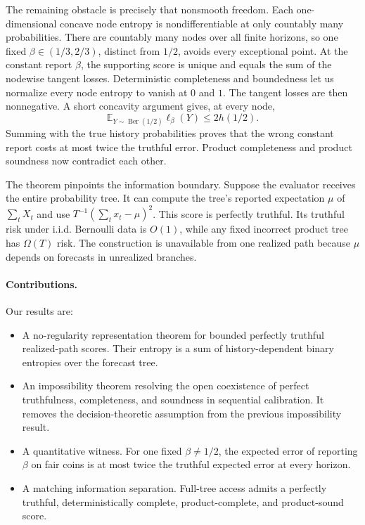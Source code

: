 \documentclass{article}
\theoremstyle{definition}
\theoremstyle{remark}
\newcommand{\Ber}{\operatorname{Ber}}
\newcommand{\E}{\mathbb E}
\newcommand{\1}{\mathbf 1}
\begin{document}
The remaining obstacle is precisely that nonsmooth freedom. Each one-dimensional concave node entropy is nondifferentiable at only countably many probabilities. There are countably many nodes over all finite horizons, so one fixed \(\beta\in(1/3,2/3)\), distinct from \(1/2\), avoids every exceptional point. At the constant report \(\beta\), the supporting score is unique and equals the sum of the nodewise tangent losses. Deterministic completeness and boundedness let us normalize every node entropy to vanish at \(0\) and \(1\). The tangent losses are then nonnegative. A short concavity argument gives, at every node, \[ \E_{Y\sim\Ber(1/2)}\ell_{\beta}(Y)\le 2h(1/2). \] Summing with the true history probabilities proves that the wrong constant report costs at most twice the truthful error. Product completeness and product soundness now contradict each other.

The theorem pinpoints the information boundary. Suppose the evaluator receives the entire probability tree. It can compute the tree's reported expectation \(\mu\) of \(\sum_tX_t\) and use \(T^{-1}(\sum_t x_t-\mu)^2\). This score is perfectly truthful. Its truthful risk under i.i.d. Bernoulli data is \(O(1)\), while any fixed incorrect product tree has \(\Omega(T)\) risk. The construction is unavailable from one realized path because \(\mu\) depends on forecasts in unrealized branches.

\paragraph{Contributions.} Our results are:
\begin{itemize}
\item A no-regularity representation theorem for bounded perfectly truthful realized-path scores. Their entropy is a sum of history-dependent binary entropies over the forecast tree.
\item An impossibility theorem resolving the open coexistence of perfect truthfulness, completeness, and soundness in sequential calibration. It removes the decision-theoretic assumption from the previous impossibility result.
\item A quantitative witness. For one fixed \(\beta\ne1/2\), the expected error of reporting \(\beta\) on fair coins is at most twice the truthful expected error at every horizon.
\item A matching information separation. Full-tree access admits a perfectly truthful, deterministically complete, product-complete, and product-sound score.
\end{itemize}
\end{document}
